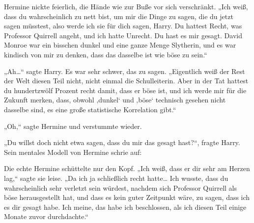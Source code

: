 Hermine nickte feierlich, die Hände wie zur Buße vor sich verschränkt.
„Ich weiß, dass du wahrscheinlich zu nett bist, um mir die Dinge zu sagen, die du jetzt sagen müsstest, also werde ich sie für dich sagen, Harry. Du hattest Recht, was Professor Quirrell angeht, und ich hatte Unrecht. Du hast es mir gesagt. David Monroe war ein bisschen dunkel und eine ganze Menge Slytherin, und es war kindisch von mir zu denken, dass das dasselbe ist wie böse zu sein.“

„Ah…“ sagte Harry. Es war sehr schwer, das zu sagen. „Eigentlich weiß der Rest der Welt diesen Teil nicht, nicht einmal die Schulleiterin. Aber in der Tat hattest du hundertzwölf Prozent recht damit, dass er böse ist, und ich werde mir für die Zukunft merken, dass, obwohl ‚dunkel‘ und ‚böse‘ technisch gesehen nicht dasselbe sind, es eine große statistische Korrelation gibt.“

„Oh,“ sagte Hermine und verstummte wieder.

„Du willst doch nicht etwa sagen, dass du mir das gesagt hast?“, fragte Harry.
Sein mentales Modell von Hermine schrie auf:

Die echte Hermine schüttelte nur den Kopf. „Ich weiß, dass er dir sehr am Herzen lag,“ sagte sie leise. „Da ich ja schließlich recht hatte… Ich wusste, dass du wahrscheinlich sehr verletzt sein würdest, nachdem sich Professor Quirrell als böse herausgestellt hat, und dass es kein guter Zeitpunkt wäre, zu sagen, dass ich es dir gesagt habe. Ich meine, das habe ich beschlossen, als ich diesen Teil einige Monate zuvor durchdachte.“

